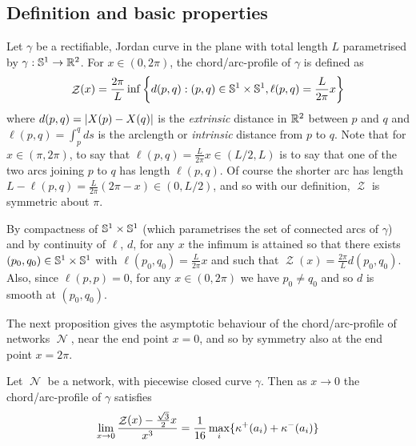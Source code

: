 \documentclass[11pt]{amsart}
\DeclareMathOperator{\chordarcprofile}{\mathcal{Z}}
\DeclareMathOperator{\network}{\mathcal{N}}
\begin{document}
\subsection{Definition and basic properties}
\label{sec:orgheadline7}

\begin{defn}
Let \(\gamma\) be a rectifiable, Jordan curve in the plane with total length \(L\) parametrised by \(\gamma: \mathbb{S}^1 \to \mathbb{R}^2\). For \(x\in (0, 2\pi)\), the chord/arc-profile of \(\gamma\) is defined as
\[
\chordarcprofile (x) = \frac{2\pi}{L} \inf\left\{d(p, q): (p,q) \in \sphere^1\times\sphere^1, \ell(p,q) = \frac{L}{2\pi} x\right\}
\]
where \(d(p,q) = \left|X(p) - X(q)\right|\) is the \emph{extrinsic} distance in \(\mathbb{R}^2\) between \(p\) and \(q\) and \(\ell(p,q) = \int_p^q ds\) is the arclength or \emph{intrinsic} distance from \(p\) to \(q\). Note that for \(x \in (\pi, 2\pi)\), to say that \(\ell(p,q) = \frac{L}{2\pi} x \in (L/2,L)\) is to say that one of the two arcs joining \(p\) to \(q\) has length \(\ell(p,q)\). Of course the shorter arc has length \(L-\ell(p,q) = \frac{L}{2\pi}(2\pi - x) \in (0, L/2)\), and so with our definition, \(\chordarcprofile\) is symmetric about \(\pi\).
\end{defn}

\begin{remark}
By compactness of \(\mathbb{S}^1\times \mathbb{S}^1\) (which parametrises the set of connected arcs of \(\gamma\)) and by continuity of \(\ell\), \(d\), for any \(x\) the infimum is attained so that there exists \((p_0,q_0) \in \mathbb{S}^1 \times \mathbb{S}^1\) with \(\ell(p_0, q_0) = \frac{L}{2\pi}x\) and such that \(\chordarcprofile(x) = \frac{2\pi}{L} d(p_0, q_0)\). Also, since \(\ell(p,p) = 0\), for any \(x\in(0,2\pi)\) we have \(p_0 \ne q_0\) and so \(d\) is smooth at \((p_0, q_0)\).
\end{remark}

The next proposition gives the asymptotic behaviour of the chord/arc-profile of networks \(\network\), near the end point \(x=0\), and so by symmetry also at the end point \(x=2\pi\).

\begin{prop}
Let \(\network\) be a network, with piecewise closed curve \(\gamma\). Then as \(x\to 0\) the chord/arc-profile of \(\gamma\) satisfies
\[
\lim_{x\to 0} \frac{\chordarcprofile(x) - \tfrac{\sqrt{3}}{2}x}{x^3} = \frac{1}{16} \max_i \{\curvecurv^+(a_i) + \curvecurv^-(a_i)\}
\]
\end{prop}
\end{document}
